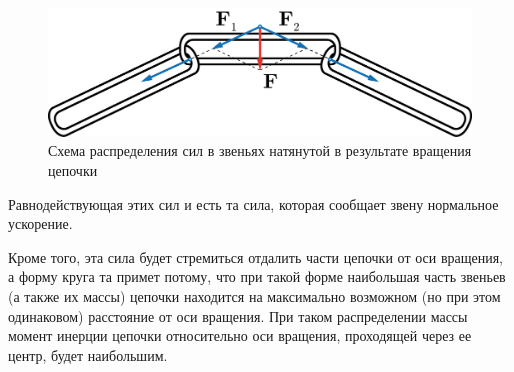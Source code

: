 \documentclass[14pt,a4paper,twoside]{extarticle}	%
\begin{document}
\begin{figure}[H] 	
	\centering 	
	\includegraphics[width=0.75\linewidth]{chain-3.png}
	\caption{Схема распределения сил в звеньях натянутой в результате вращения цепочки}
	\label{chain-3}
\end{figure}
	
Равнодействующая этих сил и есть та сила, которая сообщает звену нормальное ускорение.

Кроме того, эта сила будет стремиться отдалить части цепочки от оси вращения, а форму круга та примет потому, что при такой форме наибольшая часть звеньев (а также их массы) цепочки находится на максимально возможном (но при этом одинаковом) расстояние от оси вращения.
При таком распределении массы момент инерции цепочки относительно оси вращения, проходящей через ее центр, будет наибольшим.
		
\end{document}
